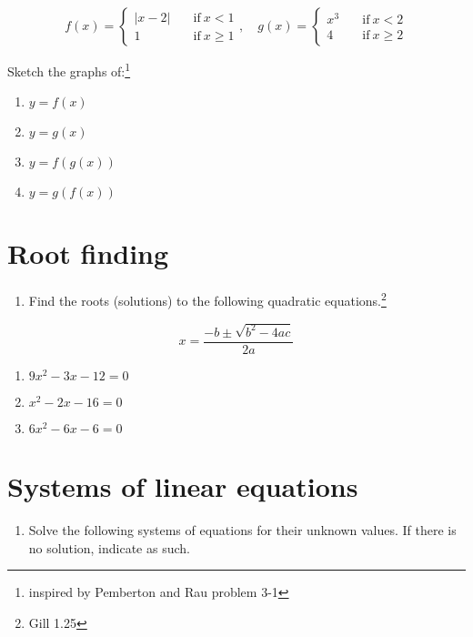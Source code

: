 \documentclass[
]{article}
\providecommand{\tightlist}{%
  \setlength{\itemsep}{0pt}\setlength{\parskip}{0pt}}
\begin{document}
\[
f(x) = \left\{
    \begin{array}{ll}
        | x -2 | & \quad \mbox{if} \ x < 1 \\
        1 & \quad \mbox{if} \ x \geq 1
    \end{array}
\right., \quad
g(x) = \left\{
    \begin{array}{ll}
        x^3 & \quad \mbox{if} \ x < 2 \\
        4 & \quad \mbox{if} \ x \geq 2
    \end{array}
\right.
\]

Sketch the graphs of:\footnote{inspired by Pemberton and Rau problem 3-1}

\begin{enumerate}
\def\labelenumi{\arabic{enumi}.}
\item
  \(y = f(x)\)
\item
  \(y = g(x)\)
\item
  \(y = f(g(x))\)
\item
  \(y = g(f(x))\)
\end{enumerate}

\section{Root finding}\label{root-finding}

\begin{enumerate}
\def\labelenumi{\arabic{enumi}.}
\setcounter{enumi}{3}
\tightlist
\item
  Find the roots (solutions) to the following quadratic
  equations.\footnote{Gill 1.25}
\end{enumerate}

\[x = \dfrac{-b \pm \sqrt{b^2 - 4ac}}{2a}\]

\begin{enumerate}
\def\labelenumi{\alph{enumi}.}
\item
  \(9x^2 - 3x - 12 = 0\)
\item
  \(x^2 - 2x - 16 = 0\)
\item
  \(6x^2 - 6x - 6 = 0\)
\end{enumerate}

\section{Systems of linear equations}\label{systems-of-linear-equations}

\begin{enumerate}
\def\labelenumi{\arabic{enumi}.}
\setcounter{enumi}{4}
\tightlist
\item
  Solve the following systems of equations for their unknown values. If
  there is no solution, indicate as such.
\end{enumerate}
\end{document}

